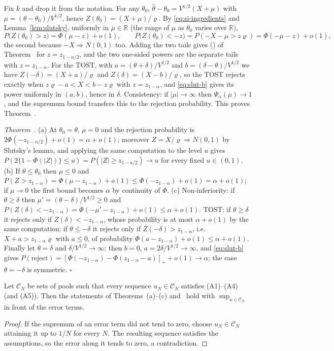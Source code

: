 Fix $k$ and drop it from the notation. For any $\theta_0$, $\hat\theta-\theta_0=V^{1/2}(X+\mu)$ with $\mu=(\theta-\theta_0)/V^{1/2}$, hence $Z(\theta_0)=(X+\mu)/\varrho$. By \eqref{eq:si-ingredients} and Lemma~\ref{lem:slutsky}, uniformly in $\mu\in\mathbb R$ (the range of $\mu$ as $\theta_0$ varies over $\mathbb R$),
\[
P\big(Z(\theta_0)>z\big)=\Phi(\mu-z)+o(1),\qquad P\big(Z(\theta_0)<-z\big)=P(-X-\mu>z\varrho)=\Phi(-\mu-z)+o(1),
\]
the second because $-X\Rightarrow N(0,1)$ too. Adding the two tails gives () of Theorem~ for $z=z_{1-\alpha/2}$, and the two one-sided powers are the separate tails with $z=z_{1-\alpha}$. For the TOST, with $a=(\theta+\delta)/V^{1/2}$ and $b=(\delta-\theta)/V^{1/2}$ we have $Z(-\delta)=(X+a)/\varrho$ and $Z(\delta)=(X-b)/\varrho$, so the TOST rejects exactly when $z\varrho-a<X<b-z\varrho$ with $z=z_{1-\alpha}$, and \eqref{eq:slut-b} gives its power uniformly in $(a,b)$, hence in $\delta$. Consistency: if $|\mu|\to\infty$ then $\Psi_\alpha(\mu)\to1$, and the supremum bound transfers this to the rejection probability. This proves Theorem~.

\emph{Theorem~.} (a) At $\theta_0=\theta$, $\mu=0$ and the rejection probability is $2\Phi(-z_{1-\alpha/2})+o(1)=\alpha+o(1)$; moreover $Z=X/\varrho\Rightarrow N(0,1)$ by Slutsky's lemma, and applying the same computation to the level $u$ gives $P(2\{1-\Phi(|Z|)\}\le u)=P(|Z|\ge z_{1-u/2})\to u$ for every fixed $u\in(0,1)$. (b) If $\theta\le\theta_0$ then $\mu\le0$ and $P(Z>z_{1-\alpha})=\Phi(\mu-z_{1-\alpha})+o(1)\le\Phi(-z_{1-\alpha})+o(1)=\alpha+o(1)$; if $\mu\to0$ the first bound becomes $\alpha$ by continuity of $\Phi$. (c) Non-inferiority: if $\theta\ge\delta$ then $\mu'=(\theta-\delta)/V^{1/2}\ge0$ and $P(Z(\delta)<-z_{1-\alpha})=\Phi(-\mu'-z_{1-\alpha})+o(1)\le\alpha+o(1)$. TOST: if $\theta\ge\delta$ it rejects only if $Z(\delta)<-z_{1-\alpha}$, whose probability is at most $\alpha+o(1)$ by the same computation; if $\theta\le-\delta$ it rejects only if $Z(-\delta)>z_{1-\alpha}$, i.e.\ $X+a>z_{1-\alpha}\varrho$ with $a\le0$, of probability $\Phi(a-z_{1-\alpha})+o(1)\le\alpha+o(1)$. Finally let $\theta=\delta$ and $\delta/V^{1/2}\to\infty$: then $b=0$, $a=2\delta/V^{1/2}\to\infty$, and \eqref{eq:slut-b} gives $P(\text{reject})=[\Phi(-z_{1-\alpha})-\Phi(z_{1-\alpha}-a)]_++o(1)\to\alpha$; the case $\theta=-\delta$ is symmetric. $\square$

\begin{corollary}[Uniformity]\label{cor:uniform}
Let $\mathcal C_N$ be sets of pools such that every sequence $u_N\in\mathcal C_N$ satisfies (A1)--(A4) (and (A5)). Then the statements of Theorems~(a)--(c) and~ hold with $\sup_{u\in\mathcal C_N}$ in front of the error terms.
\end{corollary}
\begin{proof}
If the supremum of an error term did not tend to zero, choose $u_N\in\mathcal C_N$ attaining it up to $1/N$ for every $N$. The resulting sequence satisfies the assumptions, so the error along it tends to zero, a contradiction.
\end{proof}

